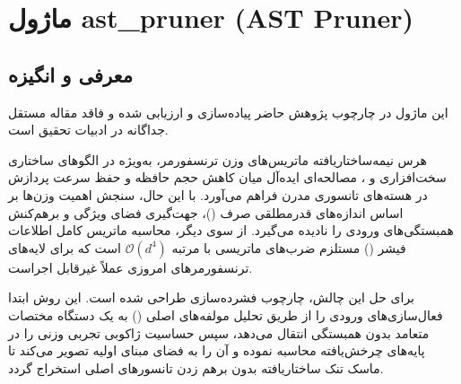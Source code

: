 \section{ماژول ast\_pruner (AST Pruner)}
\label{sec:module_ast_pruner}

\subsection{معرفی و انگیزه}
این ماژول در چارچوب پژوهش حاضر پیاده‌سازی و ارزیابی شده و فاقد مقاله مستقل جداگانه در ادبیات تحقیق است.

هرس نیمه‌ساختاریافته ماتریس‌های وزن ترنسفورمر، به‌ویژه در الگوهای ساختاری سخت‌افزاری  و ، مصالحه‌ای ایده‌آل میان کاهش حجم حافظه و حفظ سرعت پردازش در هسته‌های تانسوری مدرن فراهم می‌آورد. با این حال، سنجش اهمیت وزن‌ها بر اساس اندازه‌های قدرمطلقی صرف ()، جهت‌گیری فضای ویژگی و برهم‌کنش همبستگی‌های ورودی را نادیده می‌گیرد. از سوی دیگر، محاسبه ماتریس کامل اطلاعات فیشر () مستلزم ضرب‌های ماتریسی با مرتبه $\mathcal{O}(d^4)$ است که برای لایه‌های ترنسفورمرهای امروزی عملاً غیرقابل اجراست.

برای حل این چالش، چارچوب فشرده‌سازی  طراحی شده است. این روش ابتدا فعال‌سازی‌های ورودی را از طریق تحلیل مولفه‌های اصلی () به یک دستگاه مختصات متعامد بدون همبستگی انتقال می‌دهد، سپس حساسیت ژاکوبی تجربی وزنی را در پایه‌های چرخش‌یافته محاسبه نموده و آن را به فضای مبنای اولیه تصویر می‌کند تا ماسک تنک ساختاریافته  بدون برهم زدن تانسورهای اصلی استخراج گردد.

